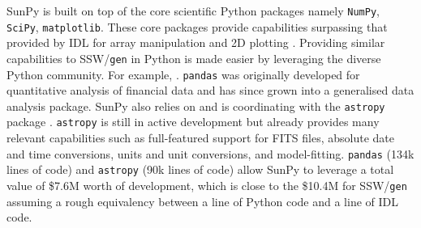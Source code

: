 SunPy is built on top of the core scientific Python packages namely 
\texttt{NumPy}, \texttt{SciPy}, \texttt{matplotlib}. These core packages 
provide capabilities surpassing that provided by IDL for array manipulation and 
2D plotting \citep{greenfield2011}. Providing similar capabilities to SSW/\texttt{gen} 
in Python is made easier by leveraging the diverse Python community. For 
example, . \texttt{pandas} was originally developed for 
quantitative analysis of financial data and has since grown into a generalised 
data analysis package. SunPy also relies on and is coordinating with the 
\texttt{astropy} package \citep{theastropycollaboration2013}. \texttt{astropy} is still in 
active development but already provides many relevant capabilities such as 
full-featured support for FITS files, absolute date and time conversions, 
units and unit conversions, and model-fitting. \texttt{pandas} (134k lines of code) 
and \texttt{astropy} (90k lines of code) allow SunPy to leverage a total value of \$7.6M 
worth of development, which is close to the \$10.4M for SSW/\texttt{gen} assuming a rough 
equivalency between a line of Python code and a line of IDL code. 
